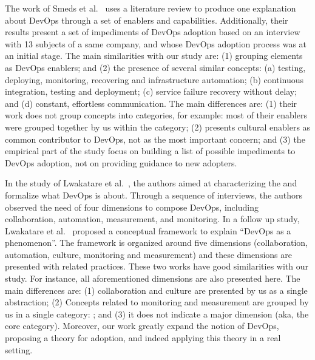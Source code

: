 The work of Smeds et al.~\cite{devops_a_definition_xp_15} uses a literature
review to produce one explanation about DevOps through a set of enablers and capabilities. Additionally, their results
present a set of impediments of DevOps adoption based on an interview with 13
subjects of a same company, and whose DevOps adoption process was at
an initial stage. The main similarities with our study are: (1) grouping
elements as DevOps enablers; and (2) the presence of several similar concepts:
(a) testing, deploying, monitoring, recovering and infrastructure automation;
(b) continuous integration, testing and deployment; (c) service failure recovery
without delay; and (d) constant, effortless communication. The main
differences are: (1) their work does not group concepts into categories,
for example: most of their enablers were grouped together by us within the  category; (2) presents cultural enablers as
common contributor to DevOps, not as the most important concern; and (3) the empirical
part of the study focus on building a list of possible impediments to DevOps
adoption, not on providing guidance to new adopters.


In the study of Lwakatare et al.~\cite{dimensions_of_devops_xp_15}, the
authors aimed at characterizing the and formalize what DevOps is about. Through
a sequence of interviews, the authors observed the need of four dimensions to compose
DevOps, including collaboration, automation, measurement, and monitoring.
In a follow up study,
Lwakatare et al.~\cite{extending_dimensions_icsea_16} proposed a conceptual
framework to explain ``DevOps as a phenomenon''. The framework is organized around
five dimensions (collaboration, automation, culture, monitoring and measurement)
and these dimensions are presented with related practices.
These two works have good similarities with our study. For instance,
all aforementioned dimensions are also presented here. The
main differences are: (1) collaboration and culture are presented by us
as a single abstraction; (2) Concepts related to monitoring and measurement are
grouped by us in a single category: ; and (3) it does
not indicate a major dimension (aka, the core category).
Moreover, our work greatly expand the notion of DevOps, proposing a theory
for adoption, and indeed applying this theory in a real setting.

